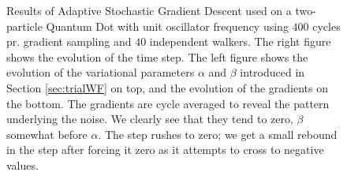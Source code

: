 \begin{figure}
 \begin{center}
  \caption{Results of Adaptive Stochastic Gradient Descent used on a two-particle Quantum Dot with unit oscillator frequency using $400$ cycles pr. gradient sampling and $40$ independent walkers. The right figure shows the evolution of the time step. The left figure shows the evolution of the variational parameters $\alpha$ and $\beta$ introduced in Section \ref{sec:trialWF} on top, and the evolution of the gradients on the bottom. The gradients are cycle averaged to reveal the pattern underlying the noise. We clearly see that they tend to zero, $\beta$ somewhat before $\alpha$. The step rushes to zero; we get a small rebound in the step after forcing it zero as it attempts to cross to negative values.}
  \label{fig:ASGD_Ex}
 \end{center}
\end{figure}


